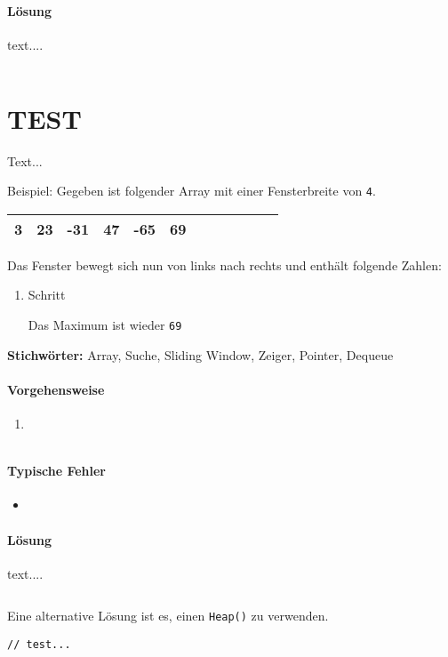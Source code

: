 \documentclass{book}
\begin{document}
\paragraph{Lösung}
text....

\begin{lstlisting}[caption=My Javascript Example]

\end{lstlisting}

\section{TEST}
\begin{examplei}
	Text...
	
	Beispiel:
	Gegeben ist folgender Array mit einer Fensterbreite von \lstinline|4|. 	
	
	\begin{tabular}{|l|l|l|l|l|l|l|l|l|l|l|l|} 
		\hline
		3 & 23 & -31 & 47 & -65 & 69 \\
		\hline
	\end{tabular}
	Das Fenster bewegt sich nun von links nach rechts und enthält folgende Zahlen:
	\begin{enumerate}
		\item Schritt	

		Das Maximum ist wieder \lstinline|69|
	\end{enumerate}
		
\end{examplei}
{\bf Stichwörter:} Array, Suche, Sliding Window, Zeiger, Pointer, Dequeue

\paragraph{Vorgehensweise}
\begin{enumerate} 
	\item 
\end{enumerate}

\begin{lstlisting}[caption=My Javascript Example]

\end{lstlisting}

\paragraph{Typische Fehler}
\begin{itemize} 
	\item 
\end{itemize}

\paragraph{Lösung}
text....

\begin{lstlisting}[caption=My Javascript Example]

\end{lstlisting}

Eine alternative Lösung ist es, einen \lstinline|Heap()| zu verwenden.
\begin{lstlisting}[caption=My Javascript Example]
// test...

\end{lstlisting}
\end{document}
